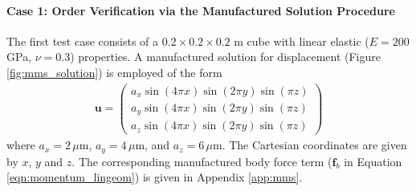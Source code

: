 \documentclass[sn-mathphys,Numbered]{sn-jnl}%
\newcommand{\bb}{\boldsymbol}
\begin{document}

 
\paragraph{Case 1: Order Verification via the Manufactured Solution Procedure}
The first test case consists of a $0.2 \times 0.2 \times 0.2$ m cube with linear elastic ($E = 200$ GPa, $\nu = 0.3$) properties.
A manufactured solution for displacement (Figure \ref{fig:mms_solution}) is employed of the form \citep{Mazzanti2024}
\begin{eqnarray}
	\bb{u} =
	\begin{pmatrix}
	a_x \sin(4\pi x) \sin(2\pi y) \sin(\pi z) \\
	a_y \sin(4 \pi x) \sin(2 \pi y) \sin(\pi z) \\
	a_z \sin(4 \pi x) \sin(2 \pi y) \sin(\pi z) 
	\end{pmatrix}
\end{eqnarray}
where $a_x = 2\,\mu$m, $a_y = 4\,\mu$m, and $a_z = 6\,\mu$m.
The Cartesian coordinates are given by $x$, $y$ and $z$.
The corresponding manufactured body force term ($\bb{f}_b$  in Equation \ref{eqn:momentum_lingeom}) is given in Appendix \ref{app:mms}.
\end{document}
